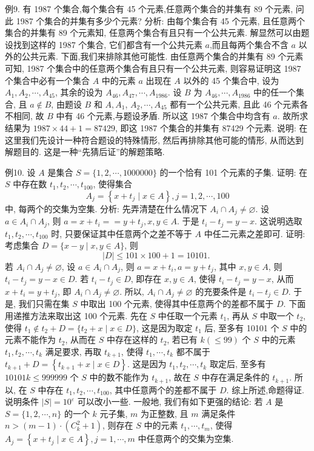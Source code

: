 例9. 有 1987 个集合,每个集合有 45 个元素,任意两个集合的并集有 89 个元素, 问此 1987 个集合的并集有多少个元素?
分析: 由每个集合有 45 个元素, 且任意两个集合的并集有 89 个元素知, 任意两个集合有且只有一个公共元素.
解显然可以由题设找到这样的 1987 个集合, 它们都含有一个公共元素 $a$,而且每两个集合不含 $a$ 以外的公共元素.
下面,我们来排除其他可能性.
由任意两个集合的并集有 89 个元素可知, 1987 个集合中的任意两个集合有且只有一个公共元素, 则容易证明这 1987 个集合中必有一个集合 $A$ 中的元素 $a$ 出现在 $A$ 以外的 45 个集合中, 设为 $A_1, A_2, \cdots, A_{45}$, 其余的设为 $A_{46}, A_{47}, \cdots, A_{1986}$.
设 $B$ 为 $A_{46}, \cdots, A_{1986}$ 中的任一个集合, 且 $a \notin B$, 由题设 $B$ 和 $A, A_1$, $A_2, \cdots, A_{45}$ 都有一个公共元素, 且此 46 个元素各不相同, 故 $B$ 中有 46 个元素,与题设矛盾.
所以这 1987 个集合中均含有 $a$.
故所求结果为 $1987 \times 44+1=87429$, 即这 1987 个集合的并集有 87429 个元素.
说明: 在这里我们先设计一种符合题设的特殊情形, 然后再排除其他可能的情形, 从而达到解题目的.
这是一种“先猜后证”的解题策略.



例10. 设 $A$ 是集合 $S=\{1,2, \cdots, 1000000\}$ 的一个恰有 101 个元素的子集.
证明: 在 $S$ 中存在数 $t_1, t_2, \cdots, t_{100}$, 使得集合
$$
A_j=\left\{x+t_j \mid x \in A\right\}, j=1,2, \cdots, 100
$$
中, 每两个的交集为空集.
分析: 先弄清楚在什么情况下 $A_i \cap A_j \neq \varnothing$. 设 $a \in A_i \cap A_j$, 则 $a=x+ t_i==y+t_j, x, y \in A$. 于是 $t_i-t_j=y-x$. 这说明选取 $t_1, t_2, \cdots, t_{100}$ 时, 只要保证其中任意两个之差不等于 $A$ 中任二元素之差即可.
证明: 考虑集合 $D=\{x-y \mid x, y \in A\}$, 则
$$
|D| \leqslant 101 \times 100+1=10101 \text {. }
$$
若 $A_i \cap A_j \neq \varnothing$, 设 $a \in A_i \cap A_j$, 则 $a=x+t_i, a=y+t_j$, 其中 $x, y \in A$, 则 $t_i-t_j=y-x \in D$.
若 $t_i-t_j \in D$, 即存在 $x, y \in A$, 使得 $t_i-t_j=y-x$, 从而 $x+t_i=y+t_j$, 即 $A_i \cap A_j \neq \varnothing$.
所以, $A_i \cap A_j \neq \varnothing$ 的充要条件是 $t_i-t_j \in D$. 于是, 我们只需在集 $S$ 中取出 100 个元素, 使得其中任意两个的差都不属于 $D$.
下面用递推方法来取出这 100 个元素.
先在 $S$ 中任取一个元素 $t_1$, 再从 $S$ 中取一个 $t_2$, 使得 $t_1 \notin t_2+D=\{t_2+ x \mid x \in D\}$, 这是因为取定 $t_1$ 后, 至多有 10101 个 $S$ 中的元素不能作为 $t_2$, 从而在 $S$ 中存在这样的 $t_2$, 若已有 $k(\leqslant 99)$ 个 $S$ 中的元素 $t_1, t_2, \cdots, t_k$ 满足要求, 再取 $t_{k+1}$, 使得 $t_1, \cdots, t_k$ 都不属于 $t_{k+1}+D=\left\{t_{k+1}+x \mid x \in D\right\}$. 这是因为 $t_1, t_2, \cdots, t_k$ 取定后, 至多有 $10101 k \leqslant 999999$ 个 $S$ 中的数不能作为 $t_{k+1}$, 故在 $S$ 中存在满足条件的 $t_{k+1}$. 所以, 在 $S$ 中存在 $t_1, t_2, \cdots, t_{100}$, 其中任意两个的差都不属于 $D$.
综上所述,命题得证.
说明条件 $|S|=10^{\varepsilon}$ 可以改小一些.
一般地, 我们有如下更强的结论: 若 $A$ 是 $S=\{1,2, \cdots, n\}$ 的一个 $k$ 元子集, $m$ 为正整数, 且 $m$ 满足条件 $n>(m-1) \cdot\left(C_k^2+1\right)$, 则存在 $S$ 中的元素 $t_1, \cdots, t_m$, 使得 $A_j=\left\{x+t_j \mid x \in A \right\}, j=1, \cdots, m$ 中任意两个的交集为空集.


